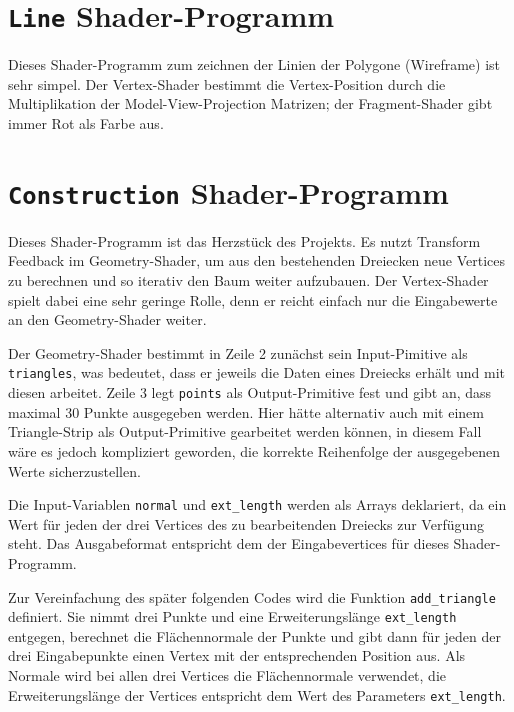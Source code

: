 \section{\lstinline{Line} Shader-Programm}
Dieses Shader-Programm zum zeichnen der Linien der Polygone (Wireframe) ist sehr simpel. Der Vertex-Shader bestimmt die Vertex-Position durch die Multiplikation der Model-View-Projection Matrizen; der Fragment-Shader gibt immer Rot als Farbe aus.

\section{\lstinline{Construction} Shader-Programm}
Dieses Shader-Programm ist das Herzstück des Projekts. Es nutzt Transform Feedback im Geometry-Shader, um aus den bestehenden Dreiecken neue Vertices zu berechnen und so iterativ den Baum weiter aufzubauen. Der Vertex-Shader spielt dabei eine sehr geringe Rolle, denn er reicht einfach nur die Eingabewerte an den Geometry-Shader weiter.

Der Geometry-Shader bestimmt in Zeile 2 zunächst sein Input-Pimitive als \lstinline{triangles}, was bedeutet, dass er jeweils die Daten eines Dreiecks erhält und mit diesen arbeitet. Zeile 3 legt \lstinline{points} als Output-Primitive fest und gibt an, dass maximal 30 Punkte ausgegeben werden. Hier hätte alternativ auch mit einem Triangle-Strip als Output-Primitive gearbeitet werden können, in diesem Fall wäre es jedoch kompliziert geworden, die korrekte Reihenfolge der ausgegebenen Werte sicherzustellen.

Die Input-Variablen \lstinline{normal} und \lstinline{ext_length} werden als Arrays deklariert, da ein Wert für jeden der drei Vertices des zu bearbeitenden Dreiecks zur Verfügung steht. Das Ausgabeformat entspricht dem der Eingabevertices für dieses Shader-Programm. 

Zur Vereinfachung des später folgenden Codes wird die Funktion \lstinline{add_triangle} definiert. Sie nimmt drei Punkte und eine Erweiterungslänge \lstinline{ext_length} entgegen, berechnet die Flächennormale der Punkte und gibt dann für jeden der drei Eingabepunkte einen Vertex mit der entsprechenden Position aus. Als Normale wird bei allen drei Vertices die Flächennormale verwendet, die Erweiterungslänge der Vertices entspricht dem Wert des Parameters \lstinline{ext_length}.

